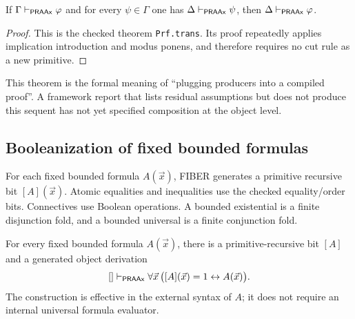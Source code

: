 \begin{theorem}
\label{thm:cut}
If \(\Gamma\vdash_{\mathsf{PRAAx}}\varphi\) and for every \(\psi\in\Gamma\) one has
\(\Delta\vdash_{\mathsf{PRAAx}}\psi\), then
\(\Delta\vdash_{\mathsf{PRAAx}}\varphi\).
\end{theorem}

\begin{proof}
This is the checked theorem \texttt{Prf.trans}.  Its proof repeatedly applies
implication introduction and modus ponens, and therefore requires no cut rule
as a new primitive.
\end{proof}

This theorem is the formal meaning of ``plugging producers into a compiled
proof''.  A framework report that lists residual assumptions but does not
produce this sequent has not yet specified composition at the object level.

\subsection{Booleanization of fixed bounded formulas}

For each fixed bounded formula \(A(\vec x)\), FIBER generates a primitive
recursive bit \([A](\vec x)\).  Atomic equalities and inequalities use the
checked equality/order bits.  Connectives use Boolean operations.  A bounded
existential is a finite disjunction fold, and a bounded universal is a finite
conjunction fold.

\begin{theorem}
\label{thm:boolean-reflection}
For every fixed bounded formula \(A(\vec x)\), there is a primitive-recursive
bit \([A]\) and a generated object derivation
\[
  []\vdash_{\mathsf{PRAAx}}\forall\vec x\,
       \bigl([A](\vec x)=1\leftrightarrow A(\vec x)\bigr).
\]
The construction is effective in the external syntax of \(A\); it does not
require an internal universal formula evaluator.
\end{theorem}

